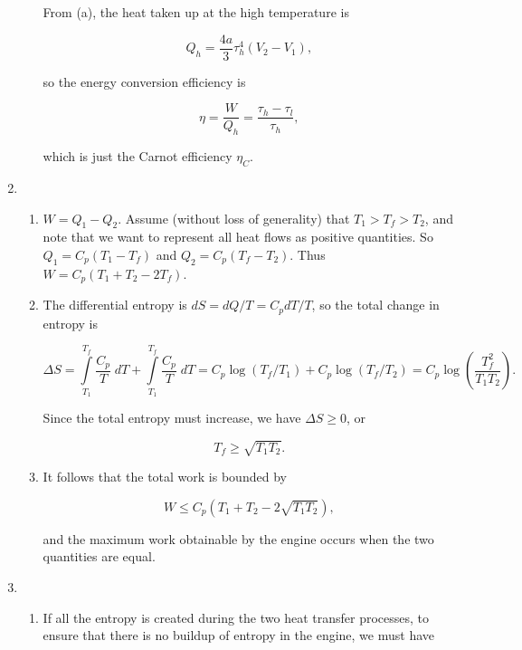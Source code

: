 \documentclass{article}
\begin{document}
\begin{enumerate}
\begin{enumerate}
		From (a), the heat taken up at the high temperature is

		$$Q_h = \frac{4a}{3} \tau_h^4 (V_2 - V_1),$$

		so the energy conversion efficiency is

		$$\eta = \frac{W}{Q_h} = \frac{\tau_h - \tau_l}{\tau_h},$$

		which is just the Carnot efficiency $\eta_C$.

	\end{enumerate}

	\item

	\begin{enumerate}

		\item

		$W = Q_1 - Q_2$. Assume (without loss of generality) that $T_1 > T_f > T_2$, and note that we want to represent all heat flows as positive quantities. So $Q_1 = C_p(T_1 - T_f)$ and $Q_2 = C_p (T_f - T_2)$. Thus $W = C_p (T_1 + T_2 - 2T_f)$.

		\item

		The differential entropy is $dS = dQ / T = C_p dT / T$, so the total change in entropy is

		$$\Delta S = \int \limits_{T_1}^{T_f} \frac{C_p}{T} \; dT + \int \limits_{T_1}^{T_f} \frac{C_p}{T} \; dT = C_p \log(T_f / T_1) + C_p \log(T_f / T_2) = C_p \log \left( \frac{T_f^2}{T_1T_2} \right).$$

		Since the total entropy must increase, we have $\Delta S \geq 0$, or

		$$T_f \geq \sqrt{T_1T_2}.$$

		\item

		It follows that the total work is bounded by 

		$$W \leq C_p (T_1 + T_2 - 2 \sqrt{T_1T_2}),$$

		and the maximum work obtainable by the engine occurs when the two quantities are equal.

	\end{enumerate}

	\item

	\begin{enumerate}

		\item

		If all the entropy is created during the two heat transfer processes, to ensure that there is no buildup of entropy in the engine, we must have


\end{enumerate}
\end{enumerate}
\end{document}
